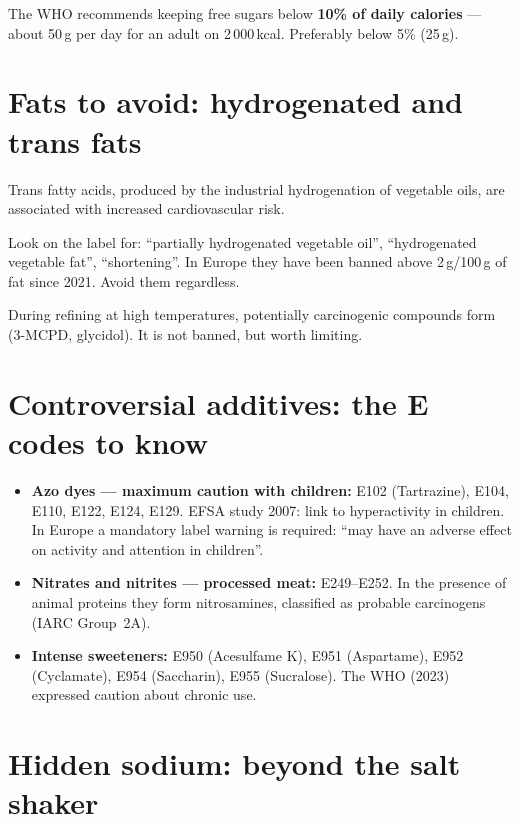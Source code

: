 \documentclass[a5paper,12pt,oneside,openany]{book}
\newcommand{\boxyellow}[2]{%
  \begin{tcolorbox}[boxbase,
    colback=warnyellow!12!white, colframe=warnyellow!80!black, title={#1}]
  #2\end{tcolorbox}}
\newcommand{\boxred}[2]{%
  \begin{tcolorbox}[boxbase,
    colback=warnred!8!white, colframe=warnred, title={#1}]
  #2\end{tcolorbox}}
\begin{document}
The WHO recommends keeping free sugars below \textbf{10\% of daily
calories} --- about 50\,g per day for an adult on 2\,000\,kcal.
Preferably below 5\% (25\,g).

\section{Fats to avoid: hydrogenated and trans fats}

Trans fatty acids, produced by the industrial hydrogenation of vegetable
oils, are associated with increased cardiovascular risk.

\boxred{Hydrogenated and partially hydrogenated fats}{Look on the label
for: ``partially hydrogenated vegetable oil'', ``hydrogenated vegetable
fat'', ``shortening''. In Europe they have been banned above 2\,g/100\,g
of fat since 2021. Avoid them regardless.}

\boxyellow{Palm oil: not trans, but\ldots}{During refining at high
temperatures, potentially carcinogenic compounds form (3-MCPD, glycidol).
It is not banned, but worth limiting.}

\section{Controversial additives: the E codes to know}

\begin{itemize}
  \item \textbf{Azo dyes --- maximum caution with children:} E102
    (Tartrazine), E104, E110, E122, E124, E129. EFSA study 2007: link to
    hyperactivity in children. In Europe a mandatory label warning is
    required: ``may have an adverse effect on activity and attention in
    children''.
  \item \textbf{Nitrates and nitrites --- processed meat:} E249--E252.
    In the presence of animal proteins they form nitrosamines, classified
    as probable carcinogens (IARC Group~2A).
  \item \textbf{Intense sweeteners:} E950 (Acesulfame K), E951
    (Aspartame), E952 (Cyclamate), E954 (Saccharin), E955 (Sucralose).
    The WHO (2023) expressed caution about chronic use.
\end{itemize}

\section{Hidden sodium: beyond the salt shaker}
\end{document}

